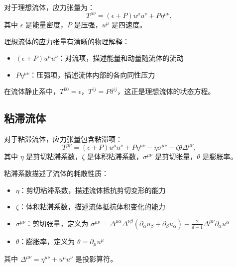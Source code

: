 \begin{definition}[理想流体的应力张量]
对于理想流体，应力张量为：
\begin{equation}
    T^{\mu\nu} = (\epsilon + P)u^\mu u^\nu + P \eta^{\mu\nu},
\end{equation}
其中 $\epsilon$ 是能量密度，$P$ 是压强，$u^\mu$ 是四速度。
\end{definition}

\begin{note}[理想流体的物理意义]
理想流体的应力张量有清晰的物理解释：
\begin{itemize}
    \item $(\epsilon + P)u^\mu u^\nu$：对流项，描述能量和动量随流体的流动
    \item $P \eta^{\mu\nu}$：压强项，描述流体内部的各向同性压力
\end{itemize}
在流体静止系中，$T^{00} = \epsilon$，$T^{ij} = P \delta^{ij}$，这正是理想流体的状态方程。
\end{note}

\subsection{粘滞流体}

\begin{definition}[粘滞流体的应力张量]
对于粘滞流体，应力张量包含粘滞项：
\begin{equation}
    T^{\mu\nu} = (\epsilon + P)u^\mu u^\nu + P \eta^{\mu\nu} - \eta \sigma^{\mu\nu} - \zeta \theta \Delta^{\mu\nu},
\end{equation}
其中 $\eta$ 是剪切粘滞系数，$\zeta$ 是体积粘滞系数，$\sigma^{\mu\nu}$ 是剪切张量，$\theta$ 是膨胀率。
\end{definition}

\begin{property}[粘滞系数的物理意义]
粘滞系数描述了流体的耗散性质：
\begin{itemize}
    \item $\eta$：剪切粘滞系数，描述流体抵抗剪切变形的能力
    \item $\zeta$：体积粘滞系数，描述流体抵抗体积变化的能力
    \item $\sigma^{\mu\nu}$：剪切张量，定义为 $\sigma^{\mu\nu} = \Delta^{\mu\alpha} \Delta^{\nu\beta} (\partial_\alpha u_\beta + \partial_\beta u_\alpha) - \frac{2}{d-1} \Delta^{\mu\nu} \partial_\alpha u^\alpha$
    \item $\theta$：膨胀率，定义为 $\theta = \partial_\mu u^\mu$
\end{itemize}
其中 $\Delta^{\mu\nu} = \eta^{\mu\nu} + u^\mu u^\nu$ 是投影算符。
\end{property}

